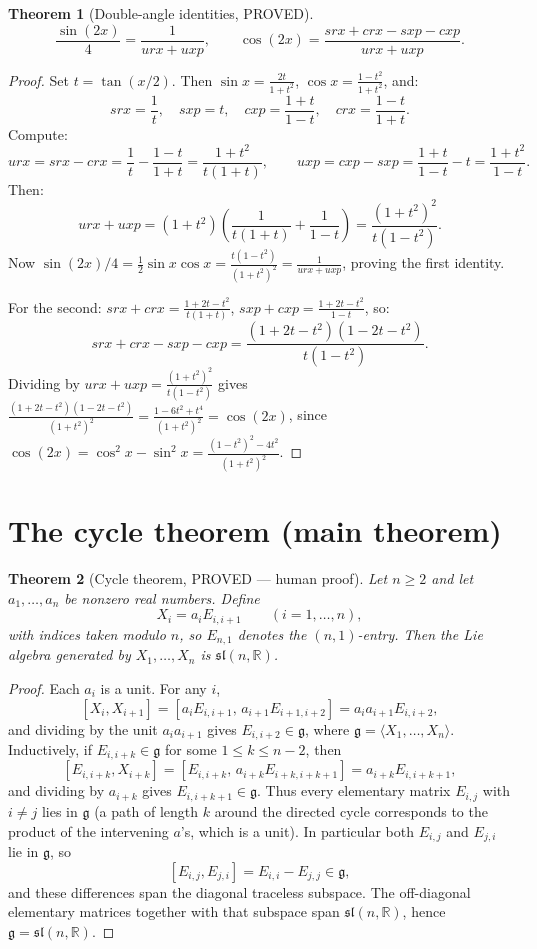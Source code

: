 \documentclass[11pt]{article}
\newtheorem{theorem}{Theorem}
\theoremstyle{definition}
\begin{document}
\begin{theorem}[Double-angle identities, PROVED]
\[
\frac{\sin(2x)}{4} = \frac{1}{urx+uxp}, \qquad
\cos(2x) = \frac{srx+crx-sxp-cxp}{urx+uxp}.
\]
\end{theorem}

\begin{proof}
Set $t=\tan(x/2)$. Then $\sin x = \frac{2t}{1+t^2}$, $\cos x = \frac{1-t^2}{1+t^2}$, and:
\[
srx = \frac{1}{t}, \quad sxp = t, \quad
cxp = \frac{1+t}{1-t}, \quad crx = \frac{1-t}{1+t}.
\]
Compute:
\[
urx = srx-crx = \frac{1}{t}-\frac{1-t}{1+t} = \frac{1+t^2}{t(1+t)},
\qquad
uxp = cxp-sxp = \frac{1+t}{1-t}-t = \frac{1+t^2}{1-t}.
\]
Then:
\[
urx+uxp = (1+t^2)\left(\frac{1}{t(1+t)}+\frac{1}{1-t}\right)
= \frac{(1+t^2)^2}{t(1-t^2)}.
\]
Now $\sin(2x)/4 = \frac{1}{2}\sin x\cos x = \frac{t(1-t^2)}{(1+t^2)^2} = \frac{1}{urx+uxp}$, proving the first identity.

For the second: $srx+crx = \frac{1+2t-t^2}{t(1+t)}$, $sxp+cxp = \frac{1+2t-t^2}{1-t}$, so:
\[
srx+crx-sxp-cxp = \frac{(1+2t-t^2)(1-2t-t^2)}{t(1-t^2)}.
\]
Dividing by $urx+uxp = \frac{(1+t^2)^2}{t(1-t^2)}$ gives $\frac{(1+2t-t^2)(1-2t-t^2)}{(1+t^2)^2} = \frac{1-6t^2+t^4}{(1+t^2)^2} = \cos(2x)$, since $\cos(2x)=\cos^2x-\sin^2x=\frac{(1-t^2)^2-4t^2}{(1+t^2)^2}$.
\end{proof}

\section{The cycle theorem (main theorem)}

\begin{theorem}[Cycle theorem, PROVED --- human proof]
Let $n\ge 2$ and let $a_1,\dots,a_n$ be nonzero real numbers. Define
\[
X_i = a_i E_{i,i+1}\qquad (i=1,\dots,n),
\]
with indices taken modulo $n$, so $E_{n,1}$ denotes the $(n,1)$-entry. Then the Lie algebra generated by $X_1,\dots,X_n$ is $\mathfrak{sl}(n,\mathbb{R})$.
\end{theorem}

\begin{proof}
Each $a_i$ is a unit. For any $i$,
\[
[X_i,X_{i+1}]
=[a_iE_{i,i+1},\,a_{i+1}E_{i+1,i+2}]
=a_i a_{i+1}E_{i,i+2},
\]
and dividing by the unit $a_i a_{i+1}$ gives $E_{i,i+2}\in\mathfrak{g}$, where $\mathfrak{g}=\langle X_1,\dots,X_n\rangle$. Inductively, if $E_{i,i+k}\in\mathfrak{g}$ for some $1\le k\le n-2$, then
\[
[E_{i,i+k},X_{i+k}]
=[E_{i,i+k},\,a_{i+k}E_{i+k,i+k+1}]
=a_{i+k}E_{i,i+k+1},
\]
and dividing by $a_{i+k}$ gives $E_{i,i+k+1}\in\mathfrak{g}$. Thus every elementary matrix $E_{i,j}$ with $i\ne j$ lies in $\mathfrak{g}$ (a path of length $k$ around the directed cycle corresponds to the product of the intervening $a$'s, which is a unit). In particular both $E_{i,j}$ and $E_{j,i}$ lie in $\mathfrak{g}$, so
\[
[E_{i,j},E_{j,i}]=E_{i,i}-E_{j,j}\in\mathfrak{g},
\]
and these differences span the diagonal traceless subspace. The off-diagonal elementary matrices together with that subspace span $\mathfrak{sl}(n,\mathbb{R})$, hence $\mathfrak{g}=\mathfrak{sl}(n,\mathbb{R})$.
\end{proof}
\end{document}
